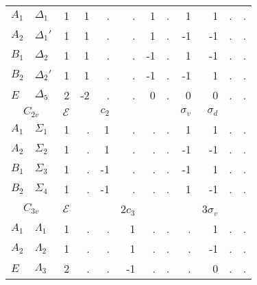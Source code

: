 \documentclass[twocolumn,showpacs,preprintnumbers,superscriptaddress,prb,floatfix,aps,10pt]{revtex4-1}
\newcommand*{\id}{\mathcal{E}}
\begin{document}
\begin{table}
\begin{ruledtabular}
\begin{tabular*}{10cm}{llrrrrrrrrrr}
$A_1$           & $\Delta_{1}  $  &  1  &     1  &     .  &     .  &     1  &   .  &          1  &          1  &          .  &          .  \\         %
$A_2$           & $\Delta_{1}' $  &  1  &     1  &     .  &     .  &     1  &   .  &         -1  &         -1  &          .  &          .  \\         %
$B_1$           & $\Delta_{2}  $  &  1  &     1  &     .  &     .  &    -1  &   .  &          1  &         -1  &          .  &          .  \\         %
$B_2$           & $\Delta_{2}' $  &  1  &     1  &     .  &     .  &    -1  &   .  &         -1  &          1  &          .  &          .  \\         %
$E$             & $\Delta_{5}  $  &  2  &    -2  &     .  &     .  &     0  &   .  &          0  &          0  &          .  &          .  \\ \hline  %
\multicolumn{2}{c}{$C_{2v}$}      &$\id$&        &  $c_2$ &        &        &      &  $\sigma_v$ & $\sigma_d$  &             &             \\
$A_{1}$         & $\Sigma_{1}  $  &  1  &     .  &     1  &     .  &     .  &   .  &          1  &          1  &          .  &          .  \\
$A_{2}$         & $\Sigma_{2}  $  &  1  &     .  &     1  &     .  &     .  &   .  &         -1  &         -1  &          .  &          .  \\
$B_{1}$         & $\Sigma_{3}  $  &  1  &     .  &    -1  &     .  &     .  &   .  &         -1  &          1  &          .  &          .  \\
$B_{2}$         & $\Sigma_{4}  $  &  1  &     .  &    -1  &     .  &     .  &   .  &          1  &         -1  &          .  &          .  \\ \hline
\multicolumn{2}{c}{$C_{3v}$}      &$\id$&        &        & 2$c_3$ &        &      &             & 3$\sigma_v$ &             &             \\
$A_{1}$         & $\Lambda_{1} $  &  1  &     .  &     .  &     1  &     .  &   .  &          .  &          1  &          .  &          .  \\
$A_{2}$         & $\Lambda_{2} $  &  1  &     .  &     .  &     1  &     .  &   .  &          .  &         -1  &          .  &          .  \\
$E$             & $\Lambda_{3} $  &  2  &     .  &     .  &    -1  &     .  &   .  &          .  &          0  &          .  &          .  \\ \hline

\end{tabular*}
\end{ruledtabular}
\end{table}
\end{document}
